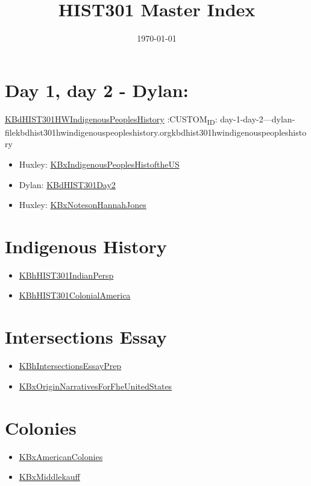 \documentclass[letterpaper]{article}
\date{\today}
\title{HIST301 Master Index}
\renewcommand{\tableofcontents}{}
\begin{document}
\tableofcontents



\section{Day 1, day 2 - Dylan:}
\label{sec:org7baa480}
\href{KBdHIST301HWIndigenousPeoplesHistory.org}{KBdHIST301HWIndigenousPeoplesHistory}
:CUSTOM\textsubscript{ID}: day-1-day-2---dylan-filekbdhist301hwindigenouspeopleshistory.orgkbdhist301hwindigenouspeopleshistory
\begin{itemize}
\item Huxley:
\href{KBxIndigenousPeoplesHistoftheUS.org}{KBxIndigenousPeoplesHistoftheUS}
\item Dylan: \href{KBdHIST301Day2.org}{KBdHIST301Day2}
\item Huxley: \href{KBxNotesonHannahJones.org}{KBxNotesonHannahJones}
\end{itemize}

\section{Indigenous History}
\label{sec:org0c9dbe1}
\begin{itemize}
\item \href{KBhHIST301IndianPersp.org}{KBhHIST301IndianPersp}
\item \href{KBhHIST301ColonialAmerica.org}{KBhHIST301ColonialAmerica}
\end{itemize}

\section{Intersections Essay}
\label{sec:orgee5fa6a}
\begin{itemize}
\item \href{KBhIntersectionsEssayPrep.org}{KBhIntersectionsEssayPrep}
\item \href{KBxOriginNarrativesForFheUnitedStates.org}{KBxOriginNarrativesForFheUnitedStates}
\end{itemize}

\section{Colonies}
\label{sec:orgd2aab7d}
\begin{itemize}
\item \href{KBxAmericanColonies.org}{KBxAmericanColonies}
\item \href{KBxMiddlekauff.org}{KBxMiddlekauff}
\end{itemize}
\end{document}
